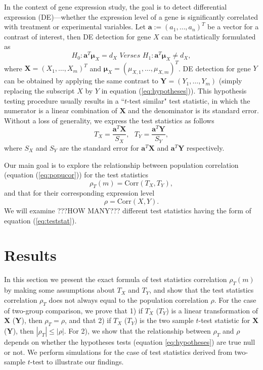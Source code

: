 \documentclass[12pt, a4paper]{article}
\newcommand{\cor}{\text{Corr}}
\begin{document}
	



	 In the context of gene expression study, the goal is to detect differential expression (DE)---whether the expression level of a gene is 
	 significantly correlated with treatment or experimental variables. Let $\bm a:=(a_1, \ldots, a_n)^T$ be a vector for a contrast of 
	 interest, then DE detection for gene $X$ can be statistically formulated as 
	 \begin{equation}\label{eq:hypotheses}
	 H_{0}:  \bm a^T\bm \mu_X = d_X \textit{     Verses   }  H_{1}: \bm a^T\bm \mu_X \neq d_X,
	 \end{equation}
	 where $\bm X = (X_1, \ldots, X_m)^T$ and $\bm \mu_{X} = (\mu_{X, 1}, \ldots, \mu_{X, m})^T$. DE detection for gene $Y$ can be obtained by applying the same contrast to $\bm Y = (Y_1, \ldots, Y_m)$ (simply replacing the subscript $X$ by $Y$ in equation (\ref{eq:hypotheses})).
	This hypothesis testing procedure usually results in a ``$t$-test similar" test statistic, in which the numerator is a linear combination of 
	$\bm X$ and the denominator is its standard error. Without a loss of generality, we express the test statistics as follows
	\begin{equation}\label{eq:teststat}
	T_X = \dfrac{\bm a^T\bm X}{S_X},  ~~~ T_Y = \dfrac{\bm a^T \bm Y}{S_Y},
	\end{equation}  
	where $S_X$ and $S_Y$ are the standard error for $\bm a^T\bm X$ and $\bm a^T\bm Y$ respectively.
	
	Our main goal is to explore the relationship between population correlation (equation (\ref{eq:popucor})) for the test statistics 
	\begin{equation}
	\rho_T(m) = \cor({T_X, T_Y}),
	\end{equation}  
	and that for their corresponding expression level 
	\begin{equation}
	\rho = \cor(X, Y). 
	\end{equation}
	We will examine ???HOW MANY??? different test statistics having the form of equation (\ref{eq:teststat}).%
		

	
	\section{Results}\label{section:tcorresults}
	
	In this section we present the exact formula of test statistics correlation $\rho_T(m)$ by making some assumptions about $T_X$ and $T_Y$, and show that the test statistics correlation $\rho_T$ does not always equal to the population correlation $\rho$. For the case of two-group comparison, we prove that 1) if $T_X$ ($T_Y$) is a linear transformation of $\bm X$ ($\bm Y$), then $\rho_T= \rho$, and that 2) if $T_X$ ($T_Y$) is the two sample $t$-test statistic for $\bm X$ ($\bm Y$), then $|\rho_T| \leq |\rho|$. For 2), we show that the relationship between $\rho_T$ and $\rho$ depends on whether the hypotheses tests (equation \ref{eq:hypotheses}) are true null or not. We perform simulations for the case of test statistics derived from two-sample $t$-test to illustrate our findings.
	
\end{document}
